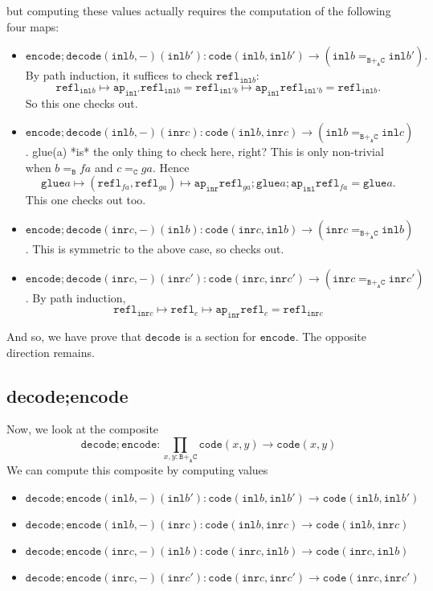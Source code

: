 \message{ !name(notes.tex)}\documentclass[12pt]{amsart}
\newcommand{\from}{\colon}
\newcommand{\edit}[1]{{\color{red} #1 }}
\newcommand{\type}[1]{\mathtt{#1}}
\newcommand{\tin}{\colon}
\newcommand{\A}{\type{A}}
\newcommand{\B}{\type{B}}
\newcommand{\C}{\type{C}}
\newcommand{\BAC}{\B +_{\A} \C}
\newcommand{\ap}{\type{ap}}
\newcommand{\inl}{\type{inl}}
\newcommand{\inr}{\type{inr}}
\newcommand{\glue}{\type{glue}}
\newcommand{\refl}{\type{refl}}
\newcommand{\code}{\type{code}}
\newcommand{\encode}{\type{encode}}
\newcommand{\decode}{\type{decode}}
\theoremstyle{remark}
\theoremstyle{definition}
\begin{document}
but computing these values actually requires the computation of the
following four maps:
\begin{itemize}
\item
  \( \encode ; \decode ( \inl b , - )(\inl b') \from \code ( \inl b ,
  \inl b' ) \to ( \inl b =_{\BAC}
  \inl b' ). \) By path
  induction, it suffices to check \( \refl_{\inl b} \):
  \[
    \refl_{\inl b} \mapsto \ap_{\inl'} \refl_{\inl b}
    = \refl_{\inl' b} \mapsto \ap_{\inl} \refl_{\inl' b} =
    \refl_{\inl b}.
  \]
  So this one checks out.
\item
  \( \encode ; \decode ( \inl b , - )(\inr c) \from \code ( \inl b ,
  \inr c ) \to ( \inl b =_{\BAC} \inl c ) \). \edit{glue(a) *is* the
    only thing to check here, right?} This is only non-trivial when
  \( b =_\B fa \) and \( c =_\C ga \). Hence
  \[
    \glue a \mapsto ( \refl_{fa} , \refl_{ga} ) \mapsto \ap_{\inr}
    \refl_{ga} ; \glue a ; \ap_{\inl} \refl_{fa} = \glue a.
  \]
  This one checks out too.
\item
  \( \encode ; \decode ( \inr c , - )(\inl b) \from \code ( \inr c ,
  \inl b ) \to ( \inr c =_{\BAC} \inl b ) \). This is
  symmetric to the above case, so checks out. 
\item
  \( \encode ; \decode ( \inr c , - )(\inr c') \from \code ( \inr c,
  \inr c' ) \to ( \inr c =_{\BAC} \inr c' ) \). By path
  induction, 
  \[
    \refl_{\inr c} \mapsto \refl_c \mapsto \ap_{\inr} \refl_c =
    \refl_{\inr c}
  \]  
\end{itemize}

And so, we have prove that \( \decode \) is a section for \( \encode
\). The opposite direction remains.

\subsection{decode;encode}

Now, we look at the composite
\[
  \decode ; \encode
  \from
  \prod\limits_{x,y \tin \BAC} \code ( x,y )
  \to
  \code ( x,y )
\]
We can compute this composite by computing values

\begin{itemize}
\item
  \( \decode ; \encode (\inl b , -) ( \inl b' ) \from \code ( \inl b ,
  \inl b' ) \to \code ( \inl b , \inl b' ) \)
\item
  \( \decode ; \encode (\inl b , -) ( \inr c ) \from \code ( \inl b ,
  \inr c ) \to \code ( \inl b , \inr c ) \)
\item
  \( \decode ; \encode (\inr c , -) ( \inl b ) \from \code ( \inr c ,
  \inl b ) \to \code ( \inr c , \inl b ) \)
\item
  \( \decode ; \encode (\inr c , -) ( \inr c' ) \from \code ( \inr c ,
  \inr c' ) \to \code ( \inr c , \inr c' ) \)
\end{itemize}
\end{document}
